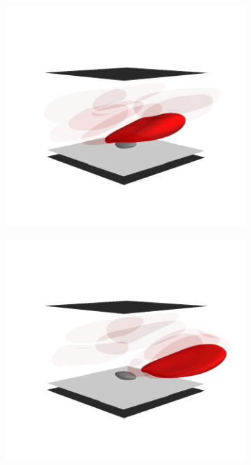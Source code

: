 \begin{figure}[tbp]
    \vspace{11pt}

    \begin{subfigure}[t]{0.5\textwidth}
        \includegraphics[trim=50 75 50 125, clip, width=\textwidth]{figures/flyover530.png}%
    \end{subfigure}%
    \begin{subfigure}[t]{0.5\textwidth}
        \includegraphics[trim=50 75 50 125, clip, width=\textwidth]{figures/flyover565.png}%
    \end{subfigure}


\end{figure}
